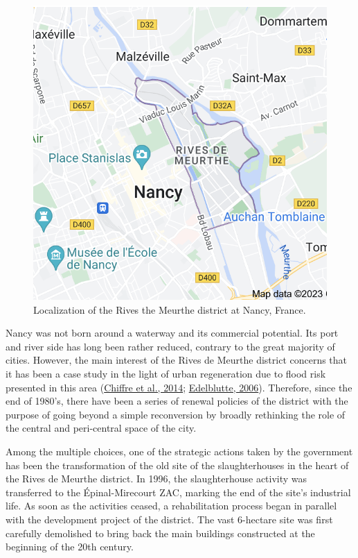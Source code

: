 \documentclass[
  11pt,
]{article}
\begin{document}
\begin{figure}
\begin{minipage}[t]{0.47\linewidth}
{{\includegraphics{figures/ok3/Rives-of-meurthe.png}

}

}

\end{minipage}%

\caption{\label{fig-rives}Localization of the Rives the Meurthe district
at Nancy, France.}

\end{figure}

Nancy was not born around a waterway and its commercial potential. Its
port and river side has long been rather reduced, contrary to the great
majority of cities. However, the main interest of the Rives de Meurthe
district concerns that it has been a case study in the light of urban
regeneration due to flood risk presented in this area
(\protect\hyperlink{ref-chiffre2014}{Chiffre et al., 2014};
\protect\hyperlink{ref-edelblutte2006}{Edelblutte, 2006}). Therefore,
since the end of 1980's, there have been a series of renewal policies of
the district with the purpose of going beyond a simple reconversion by
broadly rethinking the role of the central and peri-central space of the
city.

Among the multiple choices, one of the strategic actions taken by the
government has been the transformation of the old site of the
slaughterhouses in the heart of the Rives de Meurthe district. In 1996,
the slaughterhouse activity was transferred to the Épinal-Mirecourt ZAC,
marking the end of the site's industrial life. As soon as the activities
ceased, a rehabilitation process began in parallel with the development
project of the district. The vast 6-hectare site was first carefully
demolished to bring back the main buildings constructed at the beginning
of the 20th century.
\end{document}
